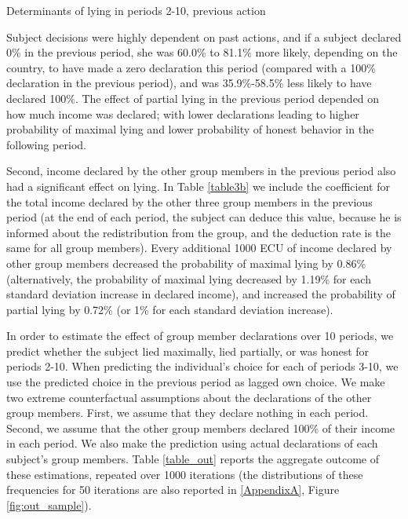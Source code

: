 \documentclass[12pt]{article}
\begin{document}
\begin{table}[ht]
\begin{center}
\tiny

\end{center}
\caption{Determinants of lying in periods 2-10, previous action}
\label{table3b}
\end{table}

\par Subject decisions were highly dependent on past actions, and if a subject declared 0\% in the previous period, she was 60.0\% to 81.1\% more likely, depending on the country, to have made a zero declaration this period (compared with a 100\% declaration in the previous period), and was 35.9\%-58.5\% less likely to have declared 100\%. The effect of partial lying in the previous period depended on how much income was declared; with lower declarations leading to higher probability of maximal lying and lower probability of honest behavior in the following period. 

\par Second, income declared by the other group members in the previous period also had a significant effect on lying. In Table \ref{table3b} we include the coefficient for the total income declared by the other three group members in the previous period (at the end of each period, the subject can deduce this value, because he is informed about the redistribution from the group, and the deduction rate is the same for all group members). Every additional 1000 ECU of income declared by other group members decreased the probability of maximal lying by 0.86\% (alternatively, the probability of maximal lying decreased by 1.19\% for each standard deviation increase in declared income), and increased the probability of partial lying by 0.72\% (or 1\% for each standard deviation increase). 

\par In order to estimate the effect of group member declarations over 10 periods, we predict whether the subject lied maximally, lied partially, or was honest for periods 2-10.\footnotemark{}
When predicting the individual's choice for each of periods 3-10, we use the predicted choice in the previous period as lagged own choice. We make two extreme counterfactual assumptions about the declarations of the other group members. First, we assume that they declare nothing in each period. Second, we assume that the other group members declared 100\% of their income in each period. We also make the prediction using actual declarations of each subject's group members. 
Table \ref{table_out} reports the aggregate outcome of these estimations, repeated over 1000 iterations (the distributions of these frequencies for 50 iterations are also reported in \ref{AppendixA}, Figure \ref{fig:out_sample}).
\end{document}
